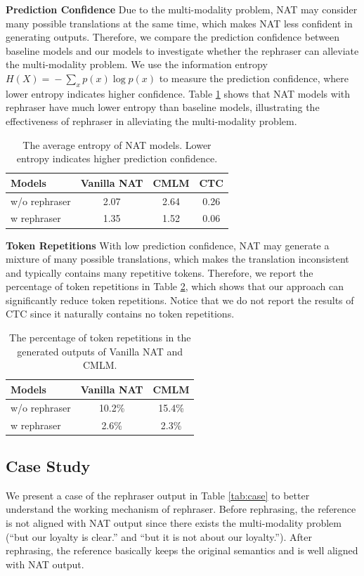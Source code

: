 \documentclass[letterpaper]{article} %
\begin{document}
\noindent{}\textbf{Prediction Confidence} Due to the multi-modality problem, NAT may consider many possible translations at the same time, which makes NAT less confident in generating outputs. Therefore, we compare the prediction confidence between baseline models and our models to investigate whether the rephraser can alleviate the multi-modality problem. We use the information entropy $H(X)\!=\!-\!\sum_{x}p(x)\log p(x)$ to measure the prediction confidence, where lower entropy indicates higher confidence. Table \ref{tab:entropy} shows that NAT models with rephraser have much lower entropy than baseline models, illustrating the effectiveness of rephraser in alleviating the multi-modality problem.
\begin{table}[t]
\small
\centering
\begin{tabular}{lccc}
\toprule
{\textbf{Models}} & {\textbf{Vanilla NAT}} & {\textbf{CMLM}} & {\textbf{CTC}}\\
\midrule
w/o rephraser&2.07&2.64&0.26\\
w rephraser&1.35&1.52&0.06\\
\bottomrule
\end{tabular}
\caption{The average entropy of NAT models. Lower entropy indicates higher prediction confidence.}
\label{tab:entropy}
\end{table}

\noindent{}\textbf{Token Repetitions} With low prediction confidence, NAT may generate a mixture of many possible translations, which makes the translation inconsistent and typically contains many repetitive tokens. Therefore, we report the percentage of token repetitions in Table \ref{tab:rep}, which shows that our approach can significantly reduce token repetitions. Notice that we do not report the results of CTC since it naturally contains no token repetitions.

\begin{table}[t]
\small
\centering
\begin{tabular}{lcc}
\toprule
{\textbf{Models}} & {\textbf{Vanilla NAT}} & {\textbf{CMLM}}\\
\midrule
w/o rephraser&10.2\%&15.4\%\\
w rephraser&2.6\%&2.3\%\\
\bottomrule
\end{tabular}
\caption{The percentage of token repetitions in the generated outputs of Vanilla NAT and CMLM.}
\label{tab:rep}
\end{table}

\subsection{Case Study}
We present a case of the rephraser output in Table \ref{tab:case} to better understand the working mechanism of rephraser. Before rephrasing, the reference is not aligned with NAT output since there exists the multi-modality problem (``but our loyalty is clear.'' and ``but it is not about our loyalty.''). After rephrasing, the reference basically keeps the original semantics and is well aligned with NAT output.
\end{document}
